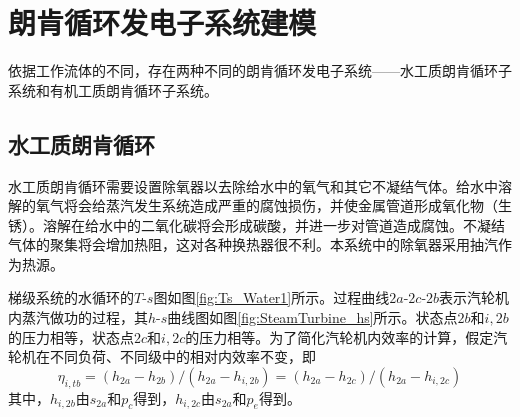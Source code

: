 
\section{朗肯循环发电子系统建模}
依据工作流体的不同，存在两种不同的朗肯循环发电子系统——水工质朗肯循环子系统和有机工质朗肯循环子系统。

\subsection{水工质朗肯循环}
  
  水工质朗肯循环需要设置除氧器以去除给水中的氧气和其它不凝结气体。给水中溶解的氧气将会给蒸汽发生系统造成严重的腐蚀损伤，并使金属管道形成氧化物（生锈）。溶解在给水中的二氧化碳将会形成碳酸，并进一步对管道造成腐蚀。不凝结气体的聚集将会增加热阻，这对各种换热器很不利。本系统中的除氧器采用抽汽作为热源。
  
  梯级系统的水循环的$T$-$s$图如图\ref{fig:Ts_Water1}所示。过程曲线$2a$-$2c$-$2b$表示汽轮机内蒸汽做功的过程，其$h$-$s$曲线图如图\ref{fig:SteamTurbine_hs}所示。状态点$2b$和$i,2b$的压力相等，状态点$2c$和$i,2c$的压力相等。为了简化汽轮机内效率的计算，假定汽轮机在不同负荷、不同级中的相对内效率不变，即
\begin{equation}
      \eta_{i,tb} =(h_{2a}-h_{2b})/(h_{2a}-h_{i,2b}) = (h_{2a}-h_{2c})/(h_{2a}-h_{i,2c})
\end{equation}
其中，$h_{i,2b}$由$s_{2a}$和$p_c$得到，$h_{i,2c}$由$s_{2a}$和$p_e$得到。

